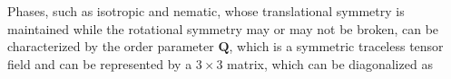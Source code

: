 \documentclass[nottitlepage]{article}
\begin{document}

Phases, such as isotropic and nematic, whose translational symmetry is maintained while the rotational symmetry may or may not be broken, can be characterized by the order parameter $\mathbf{Q}$, which is a symmetric traceless tensor field and can be represented by a $3\times 3$ matrix, which can be diagonalized as 
\end{document}
